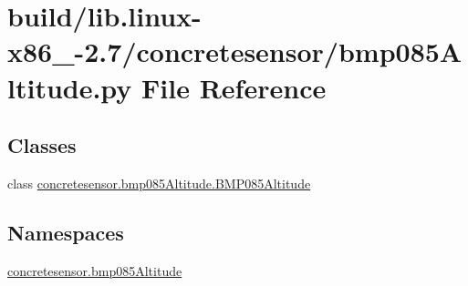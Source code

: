 \hypertarget{build_2lib_8linux-x86__64-2_87_2concretesensor_2bmp085Altitude_8py}{}\section{build/lib.linux-\/x86\+\_-\/2.7/concretesensor/bmp085\+Altitude.py File Reference}
\label{build_2lib_8linux-x86__64-2_87_2concretesensor_2bmp085Altitude_8py}
\subsection*{Classes}
\begin{DoxyCompactItemize}
\item 
class \hyperlink{classconcretesensor_1_1bmp085Altitude_1_1BMP085Altitude}{concretesensor.\+bmp085\+Altitude.\+B\+M\+P085\+Altitude}
\end{DoxyCompactItemize}
\subsection*{Namespaces}
\begin{DoxyCompactItemize}
\item 
 \hyperlink{namespaceconcretesensor_1_1bmp085Altitude}{concretesensor.\+bmp085\+Altitude}
\end{DoxyCompactItemize}

